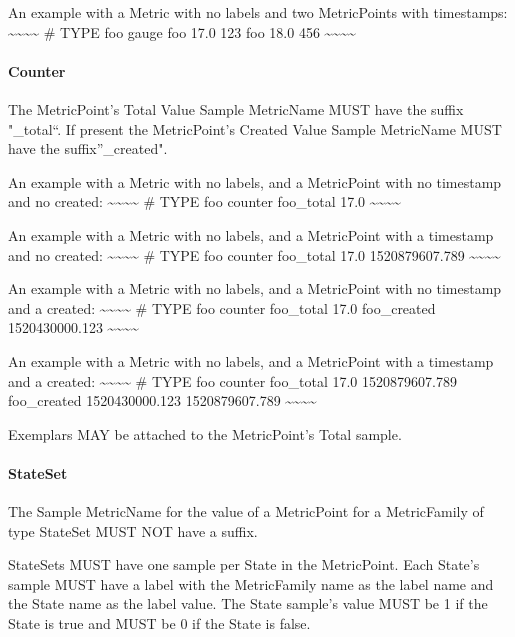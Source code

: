 \documentclass[a4paper,12pt,notitlepage,twoside,openright]{article}
\begin{document}
An example with a Metric with no labels and two MetricPoints with
timestamps:
\textasciitilde\textasciitilde\textasciitilde\textasciitilde{} \# TYPE
foo gauge foo 17.0 123 foo 18.0 456
\textasciitilde\textasciitilde\textasciitilde\textasciitilde{}

\hypertarget{counter-1}{%
\paragraph{Counter}\label{counter-1}}

The MetricPoint's Total Value Sample MetricName MUST have the suffix
"\_total``. If present the MetricPoint's Created Value Sample MetricName
MUST have the suffix''\_created".

An example with a Metric with no labels, and a MetricPoint with no
timestamp and no created:
\textasciitilde\textasciitilde\textasciitilde\textasciitilde{} \# TYPE
foo counter foo\_total 17.0
\textasciitilde\textasciitilde\textasciitilde\textasciitilde{}

An example with a Metric with no labels, and a MetricPoint with a
timestamp and no created:
\textasciitilde\textasciitilde\textasciitilde\textasciitilde{} \# TYPE
foo counter foo\_total 17.0 1520879607.789
\textasciitilde\textasciitilde\textasciitilde\textasciitilde{}

An example with a Metric with no labels, and a MetricPoint with no
timestamp and a created:
\textasciitilde\textasciitilde\textasciitilde\textasciitilde{} \# TYPE
foo counter foo\_total 17.0 foo\_created 1520430000.123
\textasciitilde\textasciitilde\textasciitilde\textasciitilde{}

An example with a Metric with no labels, and a MetricPoint with a
timestamp and a created:
\textasciitilde\textasciitilde\textasciitilde\textasciitilde{} \# TYPE
foo counter foo\_total 17.0 1520879607.789 foo\_created 1520430000.123
1520879607.789
\textasciitilde\textasciitilde\textasciitilde\textasciitilde{}

Exemplars MAY be attached to the MetricPoint's Total sample.

\hypertarget{stateset-1}{%
\paragraph{StateSet}\label{stateset-1}}

The Sample MetricName for the value of a MetricPoint for a MetricFamily
of type StateSet MUST NOT have a suffix.

StateSets MUST have one sample per State in the MetricPoint. Each
State's sample MUST have a label with the MetricFamily name as the label
name and the State name as the label value. The State sample's value
MUST be 1 if the State is true and MUST be 0 if the State is false.
\end{document}
